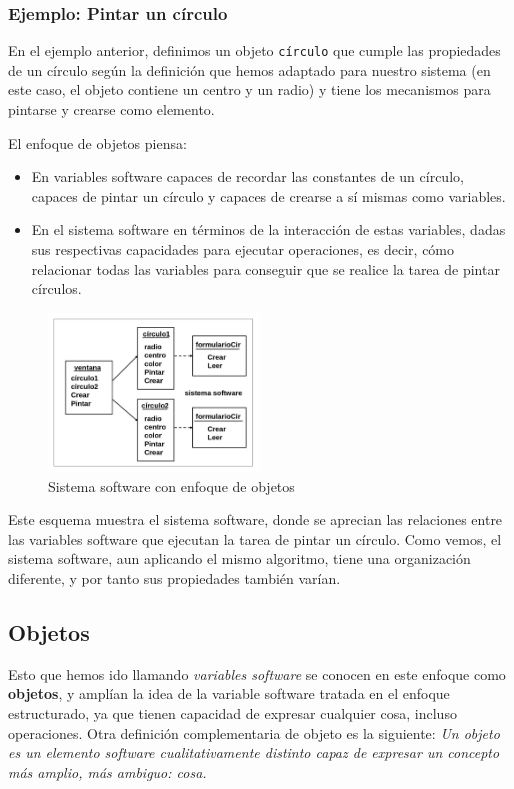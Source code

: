 \subsubsection{Ejemplo: Pintar un círculo}
\label{sec:orge1a8962} En el ejemplo anterior, definimos un objeto
\texttt{círculo} que cumple las propiedades de un círculo según la
definición que hemos adaptado para nuestro sistema (en este caso, el
objeto contiene un centro y un radio) y tiene los mecanismos para
pintarse y crearse como elemento.

El enfoque de objetos piensa:
\begin{itemize}
\item En variables software capaces de recordar las constantes de un
  círculo, capaces de pintar un círculo y capaces de crearse a sí mismas
  como variables.
\item En el sistema software en términos de la interacción de estas
  variables, dadas sus respectivas capacidades para ejecutar
  operaciones, es decir, cómo relacionar todas las variables para
  conseguir que se realice la tarea de pintar círculos.
\end{itemize}

\begin{figure}[ht!]  \centering
  \includegraphics[width=0.5\textwidth]{images/fig18}
  \caption{Sistema software con enfoque de objetos}
  \label{fig:18}
\end{figure}

Este esquema muestra el sistema software, donde se aprecian las
relaciones entre las variables software que ejecutan la tarea de
pintar un círculo.  Como vemos, el sistema software, aun aplicando el
mismo algoritmo, tiene una organización diferente, y por tanto sus
propiedades también varían.
\subsection{Objetos}
\label{sec:org2b984f4} Esto que hemos ido llamando \emph{variables
  software} se conocen en este enfoque como \textbf{objetos}, y amplían
la idea de la variable software tratada en el enfoque estructurado, ya
que tienen capacidad de expresar cualquier cosa, incluso operaciones.
Otra definición complementaria de objeto es la siguiente: \emph{Un
  objeto es un elemento software cualitativamente distinto capaz de
  expresar un concepto más amplio, más ambiguo: cosa.}

